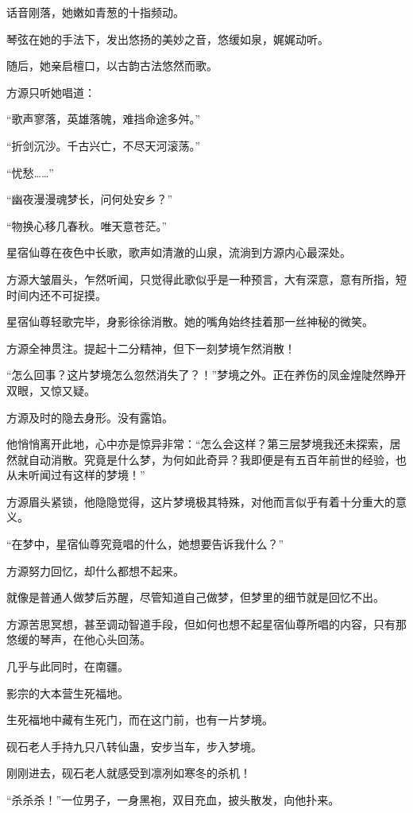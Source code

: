 \begin{this_body}
话音刚落，她嫩如青葱的十指频动。

琴弦在她的手法下，发出悠扬的美妙之音，悠缓如泉，娓娓动听。

随后，她亲启檀口，以古韵古法悠然而歌。

方源只听她唱道：

“歌声寥落，英雄落魄，难挡命途多舛。”

“折剑沉沙。千古兴亡，不尽天河滚荡。”

“忧愁……”

“幽夜漫漫魂梦长，问何处安乡？”

“物换心移几春秋。唯天意苍茫。”

星宿仙尊在夜色中长歌，歌声如清澈的山泉，流淌到方源内心最深处。

方源大皱眉头，乍然听闻，只觉得此歌似乎是一种预言，大有深意，意有所指，短时间内还不可捉摸。

星宿仙尊轻歌完毕，身影徐徐消散。她的嘴角始终挂着那一丝神秘的微笑。

方源全神贯注。提起十二分精神，但下一刻梦境乍然消散！

“怎么回事？这片梦境怎么忽然消失了？！”梦境之外。正在养伤的凤金煌陡然睁开双眼，又惊又疑。

方源及时的隐去身形。没有露馅。

他悄悄离开此地，心中亦是惊异非常：“怎么会这样？第三层梦境我还未探索，居然就自动消散。究竟是什么梦，为何如此奇异？我即便是有五百年前世的经验，也从未听闻过有这样的梦境！”

方源眉头紧锁，他隐隐觉得，这片梦境极其特殊，对他而言似乎有着十分重大的意义。

“在梦中，星宿仙尊究竟唱的什么，她想要告诉我什么？”

方源努力回忆，却什么都想不起来。

就像是普通人做梦后苏醒，尽管知道自己做梦，但梦里的细节就是回忆不出。

方源苦思冥想，甚至调动智道手段，但如何也想不起星宿仙尊所唱的内容，只有那悠缓的琴声，在他心头回荡。

几乎与此同时，在南疆。

影宗的大本营生死福地。

生死福地中藏有生死门，而在这门前，也有一片梦境。

砚石老人手持九只八转仙蛊，安步当车，步入梦境。

刚刚进去，砚石老人就感受到凛冽如寒冬的杀机！

“杀杀杀！”一位男子，一身黑袍，双目充血，披头散发，向他扑来。


\end{this_body}
